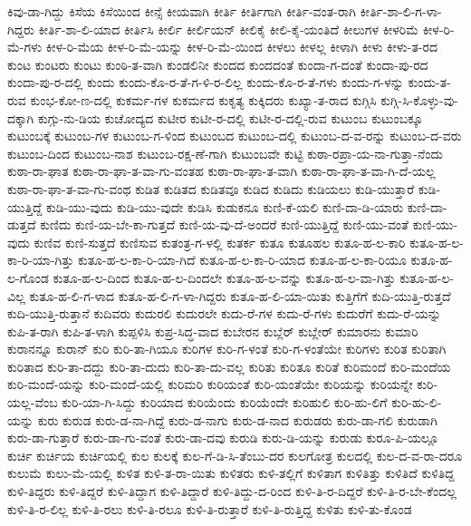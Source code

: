 {ಕಿವು-ಡಾ-ಗಿದ್ದು
ಕಿಸೆಯ
ಕಿಸೆಯಿಂದ
ಕೀನ್ಸೆ
ಕೀಯವಾಗಿ
ಕೀರ್ತಿ
ಕೀರ್ತಿಗಾಗಿ
ಕೀರ್ತಿ-ವಂತ-ರಾಗಿ
ಕೀರ್ತಿ-ಶಾ-ಲಿ-ಗ-ಳಾ-ಗಿದ್ದರು
ಕೀರ್ತಿ-ಶಾ-ಲಿ-ಯಾದ
ಕೀರ್ತಿಸಿ
ಕೀರ್ಲಿ
ಕೀರ್ಲಿಯನ್
ಕೀಲಿಕೈ
ಕೀಲಿ-ಕೈ-ಯಂತಿದೆ
ಕೀಲುಗಳ
ಕೀಳರಿಮೆ
ಕೀಳ-ರಿ-ಮೆ-ಗಳು
ಕೀಳ-ರಿ-ಮೆಯ
ಕೀಳ-ರಿ-ಮೆ-ಯನ್ನು
ಕೀಳ-ರಿ-ಮೆ-ಯಿಂದ
ಕೀಳಲು
ಕೀಳಲ್ಲ
ಕೀಳಾಗಿ
ಕೀಳು
ಕೀಳು-ತ-ರದ
ಕುಂಟ
ಕುಂಟರು
ಕುಂಟು
ಕುಂಠಿ-ತ-ವಾಗಿ
ಕುಂಡಲಿನೀ
ಕುಂದದ
ಕುಂದದಂತೆ
ಕುಂದಾ-ಗ-ದಂತೆ
ಕುಂದಾ-ಪು-ರದ
ಕುಂದಾ-ಪು-ರ-ದಲ್ಲಿ
ಕುಂದು
ಕುಂದು-ಕೊ-ರ-ತೆ-ಗ-ಳಿ-ರ-ಲಿಲ್ಲ
ಕುಂದು-ಕೊ-ರ-ತೆ-ಗಳು
ಕುಂದು-ಗ-ಳನ್ನು
ಕುಂದು-ತ-ರುವ
ಕುಂಭ-ಕೋ-ಣ-ದಲ್ಲಿ
ಕುಕರ್ಮ-ಗಳ
ಕುಕರ್ಮದ
ಕುಕೃತ್ಯ
ಕುಕ್ಕಿದರು
ಕುಖ್ಯಾ-ತ-ರಾದ
ಕುಗ್ಗಿಸಿ
ಕುಗ್ಗಿ-ಸಿ-ಕೊಳ್ಳು-ವು-ದಕ್ಕಾಗಿ
ಕುಗ್ಗು-ನು-ಡಿಯ
ಕುಚೋದ್ಯದ
ಕುಟೀರ
ಕುಟೀ-ರ-ದಲ್ಲಿ
ಕುಟೀ-ರ-ದಲ್ಲಿ-ರುವ
ಕುಟುಂಬ
ಕುಟುಂಬಕ್ಕೂ
ಕುಟುಂಬಕ್ಕೆ
ಕುಟುಂಬ-ಗಳ
ಕುಟುಂಬ-ಗ-ಳಿಂದ
ಕುಟುಂಬದ
ಕುಟುಂಬ-ದಲ್ಲಿ
ಕುಟುಂಬ-ದ-ವ-ರನ್ನು
ಕುಟುಂಬ-ದ-ವರು
ಕುಟುಂಬ-ದಿಂದ
ಕುಟುಂಬ-ನಾಶ
ಕುಟುಂಬ-ರಕ್ಷ-ಣೆ-ಗಾಗಿ
ಕುಟುಂಬವೇ
ಕುಟ್ಟಿ
ಕುಠಾ-ರಪ್ರಾ-ಯ-ನಾ-ಗುತ್ತಾ-ನೆಂದು
ಕುಠಾ-ರಾ-ಘಾತ
ಕುಠಾ-ರಾ-ಘಾ-ತ-ವಾ-ಗು-ವಂತಹ
ಕುಠಾ-ರಾ-ಘಾ-ತ-ವಾಗಿ
ಕುಠಾ-ರಾ-ಘಾ-ತ-ವಾ-ಗಿ-ದೆ-ಯಲ್ಲ
ಕುಠಾ-ರಾ-ಘಾ-ತ-ವಾ-ಗು-ವಂಥ
ಕುಡಿತ
ಕುಡಿತದ
ಕುಡಿತವೂ
ಕುಡಿದ
ಕುಡಿದು
ಕುಡಿಯಲು
ಕುಡಿ-ಯುತ್ತಾರೆ
ಕುಡಿ-ಯುತ್ತಿದ್ದೆ
ಕುಡಿ-ಯು-ವುದು
ಕುಡಿ-ಯು-ವುದೇ
ಕುಡಿಸಿ
ಕುಡುಕನೂ
ಕುಣಿ-ಕೆ-ಯಲಿ
ಕುಣಿ-ದಾ-ಡಿ-ಯಾರು
ಕುಣಿ-ದಾ-ಡುತ್ತದೆ
ಕುಣಿದು
ಕುಣಿ-ಯ-ಬೇ-ಕಾ-ಗುತ್ತದೆ
ಕುಣಿ-ಯ-ವು-ದೆ-ಅಂದರೆ
ಕುಣಿ-ಯುತ್ತಿದ್ದೆ
ಕುಣಿ-ಯು-ವಂತೆ
ಕುಣಿ-ಯು-ವುದು
ಕುಣಿವ
ಕುಣಿ-ಸುತ್ತದೆ
ಕುಣಿಸುವ
ಕುತಂತ್ರ-ಗ-ಳಲ್ಲಿ
ಕುತರ್ಕ
ಕುತೂ
ಕುತೂಹಲ
ಕುತೂ-ಹ-ಲ-ಕಾರಿ
ಕುತೂ-ಹ-ಲ-ಕಾ-ರಿ-ಯಾ-ಗಿತ್ತು
ಕುತೂ-ಹ-ಲ-ಕಾ-ರಿ-ಯಾ-ಗಿದೆ
ಕುತೂ-ಹ-ಲ-ಕಾ-ರಿ-ಯಾದ
ಕುತೂ-ಹ-ಲ-ಕಾ-ರಿಯೂ
ಕುತೂ-ಹ-ಲ-ಗೊಂಡ
ಕುತೂ-ಹ-ಲ-ದಿಂದ
ಕುತೂ-ಹ-ಲ-ದಿಂದಲೇ
ಕುತೂ-ಹ-ಲ-ವನ್ನು
ಕುತೂ-ಹ-ಲ-ವಾ-ಗಿತ್ತು
ಕುತೂ-ಹ-ಲ-ವಿಲ್ಲ
ಕುತೂ-ಹ-ಲಿ-ಗ-ಳಾದ
ಕುತೂ-ಹ-ಲಿ-ಗ-ಳಾ-ಗಿದ್ದರು
ಕುತೂ-ಹ-ಲಿ-ಯಾ-ಯಿತು
ಕುತ್ತಿಗೆಗೆ
ಕುದಿ-ಯುತ್ತಿ-ರುತ್ತದೆ
ಕುದಿ-ಯುತ್ತಿ-ರುತ್ತಾನೆ
ಕುದಿವರು
ಕುದುರಲಿ
ಕುದುರಲೇ
ಕುದು-ರೆ-ಗಳ
ಕುದು-ರೆ-ಗಳು
ಕುದುರೆಗೆ
ಕುದು-ರೆ-ಯನ್ನು
ಕುಪಿ-ತ-ರಾಗಿ
ಕುಪಿ-ತ-ಳಾಗಿ
ಕುಪ್ಪಳಿಸಿ
ಕುಪ್ರ-ಸಿದ್ಧ-ವಾದ
ಕುಬೇರನ
ಕುಬ್ಲೆರ್
ಕುಬ್ಲೇರ್
ಕುಮಾರನು
ಕುಮಾರಿ
ಕುರಾನನ್ನೂ
ಕುರಾನ್
ಕುರಿ
ಕುರಿ-ತಾ-ಗಿಯೂ
ಕುರಿಗಳ
ಕುರಿ-ಗ-ಳಂತೆ
ಕುರಿ-ಗ-ಳಂತೆಯೇ
ಕುರಿಗಳು
ಕುರಿತ
ಕುರಿತಾಗಿ
ಕುರಿತಾದ
ಕುರಿ-ತಾ-ದದ್ದು
ಕುರಿ-ತಾ-ದುದು
ಕುರಿ-ತಾ-ದು-ವಲ್ಲ
ಕುರಿತು
ಕುರಿತೂ
ಕುರಿತೆ
ಕುರಿಮಂದೆ
ಕುರಿ-ಮಂದೆಯ
ಕುರಿ-ಮಂದೆ-ಯನ್ನು
ಕುರಿ-ಮಂದೆ-ಯಲ್ಲಿ
ಕುರಿಮರಿ
ಕುರಿಯಂತೆ
ಕುರಿ-ಯಂತೆಯೇ
ಕುರಿಯನ್ನು
ಕುರಿಯನ್ನೇ
ಕುರಿ-ಯಲ್ಲ-ವೆಂಬ
ಕುರಿ-ಯಾ-ಗಿ-ಸಿದ್ದು
ಕುರಿಯಾದ
ಕುರಿಯೆಂದು
ಕುರಿಯೆಂದೇ
ಕುರಿಹುಲಿ
ಕುರಿ-ಹು-ಲಿಗೆ
ಕುರಿ-ಹು-ಲಿ-ಯನ್ನು
ಕುರು
ಕುರುಡ
ಕುರು-ಡ-ನಾ-ಗಿದ್ದೆ
ಕುರು-ಡ-ನಾಗು
ಕುರು-ಡ-ನಾದ
ಕುರುಡರು
ಕುರು-ಡಾ-ಗಲಿ
ಕುರುಡಾಗಿ
ಕುರು-ಡಾ-ಗುತ್ತಾರೆ
ಕುರು-ಡಾ-ಗು-ವಂತೆ
ಕುರು-ಡಾ-ದವು
ಕುರುಡಿ
ಕುರು-ಡಿ-ಯನ್ನು
ಕುರುಡು
ಕುರೂ-ಪಿ-ಯಲ್ಲೂ
ಕುರ್ಚಿ
ಕುರ್ಚಿಯ
ಕುರ್ಚಿಯಲ್ಲಿ
ಕುಲ
ಕುಲಕ್ಕೆ
ಕುಲ-ಗೆ-ಡಿ-ಸಿ-ತೆಂಬು-ದರ
ಕುಲಗೋತ್ರ
ಕುಲದಲ್ಲಿ
ಕುಲ-ದ-ವ-ರಾ-ದರೂ
ಕುಲುಮೆ
ಕುಲು-ಮೆ-ಯಲ್ಲಿ
ಕುಳಿತ
ಕುಳಿ-ತ-ರಾ-ಯಿತು
ಕುಳಿತರು
ಕುಳಿ-ತಲ್ಲಿಗೆ
ಕುಳಿತಾಗ
ಕುಳಿತಿತ್ತು
ಕುಳಿತಿದೆ
ಕುಳಿತಿದ್ದ
ಕುಳಿ-ತಿದ್ದರು
ಕುಳಿ-ತಿದ್ದರೆ
ಕುಳಿ-ತಿದ್ದಾಗ
ಕುಳಿ-ತಿದ್ದಾರೆ
ಕುಳಿ-ತಿದ್ದು-ದ-ರಿಂದ
ಕುಳಿ-ತಿ-ರ-ದಿದ್ದರೆ
ಕುಳಿ-ತಿ-ರ-ಬೇ-ಕೆಂದಲ್ಲ
ಕುಳಿ-ತಿ-ರ-ಲಿಲ್ಲ
ಕುಳಿ-ತಿ-ರಲು
ಕುಳಿ-ತಿ-ರಲೂ
ಕುಳಿ-ತಿ-ರುತ್ತಾರೆ
ಕುಳಿ-ತಿ-ರುತ್ತಿದ್ದ
ಕುಳಿತು
ಕುಳಿ-ತು-ಕೊಂಡ
}
